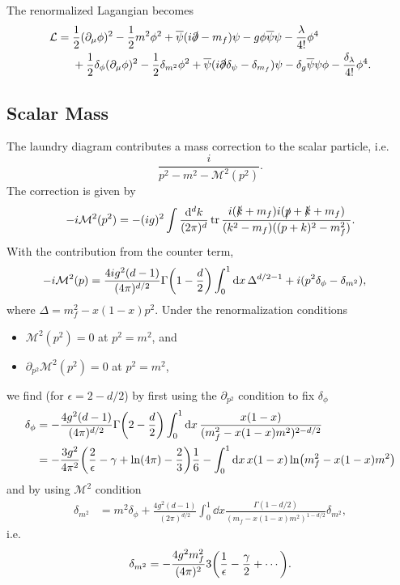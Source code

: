 \documentclass{article}
\begin{document}
The renormalized Lagangian becomes
\begin{align*}
    \mathcal{L} &= \frac{1}{2}(\partial_\mu \phi)^2 - \frac{1}{2} m^2 \phi^2 + \overline{\psi}(i\slashed{\partial} - m_f) \psi - g\phi\overline{\psi}\psi - \frac{\lambda}{4!} \phi^4 \\
    &{\phantom{{}={}}} + \frac{1}{2} \delta_\phi(\partial_\mu \phi)^2 - \frac{1}{2} \delta_{m^2} \phi^2 + \overline{\psi}(i\slashed{\partial} \delta_\psi - \delta_{m_f}) \psi - \delta_g \overline{\psi} \psi\phi - \frac{\delta_\lambda}{4!}\phi^4.
\end{align*}

\subsection{Scalar Mass}

The laundry diagram contributes a mass correction to the scalar particle, i.e.
\[ \frac{i}{p^2 - m^2 - \mathcal{M}^2(p^2)}. \]
The correction is given by
\[ -i\mathcal{M}^2(p^2) = -(ig)^2 \int \frac{\dd[d]{k}}{(2\pi)^d} \tr \frac{i(\slashed{k} + m_f)i(\slashed{p} + \slashed{k} + m_f)}{(k^2 - m_f)((p+k)^2 - m_f^2)}. \]
With the contribution from the counter term,
\begin{align*}
    -i\mathcal{M}^2(p) &= \frac{4ig^2(d-1)}{(4\pi)^{d/2}} \Gamma\qty(1-\frac{d}{2}) \int_0^1 \dd{x} \Delta^{d/2 - 1} + i(p^2 \delta_\phi - \delta_{m^2}),
\end{align*}
where $\Delta = m_f^2 - x(1-x) p^2$.
Under the renormalization conditions
\begin{itemize}
    \item $\mathcal{M}^2(p^2) = 0$ at $p^2 = m^2$, and
    \item $\partial_{p^2} \mathcal{M}^2(p^2) = 0$ at $p^2 = m^2$,
\end{itemize}
we find (for $\epsilon = 2 - d/2$) by first using the $\partial_{p^2}$ condition to fix $\delta_\phi$
\begin{align*}
    \delta_\phi &= -\frac{4g^2(d-1)}{(4\pi)^{d/2}} \Gamma\qty(2-\frac{d}{2}) \int_0^1 \dd{x} \frac{x(1-x)}{(m_f^2 - x(1-x)m^2)^{2-d/2}} \\
    &= -\frac{3g^2}{4\pi^2}\qty(\frac{2}{\epsilon} - \gamma + \ln(4\pi) - \frac{2}{3})\frac{1}{6} - \int_0^1 \dd{x} x(1-x) \ln(m^2_f - x(1-x) m^2)
\end{align*}
and by using $\mathcal{M}^2$ condition
\begin{align*}
    \delta_{m^2} &= m^2 \delta_\phi + \frac{4g^2(d-1)}{(2\pi)^{d/2}} \int_0^1 \dd{x} \frac{\Gamma(1-d/2)}{(m_f - x(1-x)m^2)^{1-d/2}} \delta_{m^2},
\end{align*}
i.e.
\[ \delta_{m^2} = -\frac{4g^2 m_f^2}{(4\pi)^2} 3\qty(\frac{1}{\epsilon} - \frac{\gamma}{2} + \cdots). \]
\end{document}

